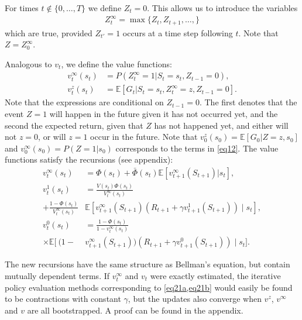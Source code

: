 \documentclass[letterpaper]{article} %
\newcommand{\EE}{\mathbb{E}}
\begin{document}
	For times $t \notin \{0,\dots,T\}$ we define $Z_t = 0$. This allows us to introduce the variables %
	\begin{align}
		Z_t^\infty = \max\{Z_t,Z_{t+1}, \dots,\} %
	\end{align} 
	which are true, provided $Z_{t'}=1$ occurs at a time step following $t$. Note that $Z = Z_0^\infty$. 
	
	
	Analogous to $v_t$, we define the value functions:
	\begin{align}
		v^{\infty}_t(s_t) & = P(Z^\infty_t =1 | S_t=s_t, Z_{t-1} = 0), \label{eq18} \\
		v^{z}_t(s_t) & = \EE[G_t | S_t=s_t, Z_t^\infty = z, Z_{t-1} = 0].  \label{eq19} 
	\end{align}
	Note that the expressions are conditional on $Z_{t-1} = 0$. The first denotes that the event $Z=1$ will happen in the future given it has not occurred yet, and the second the expected return, given that $Z$ has not happened yet, and either will not $z=0$, or will $z=1$ occur in the future. Note that $v^z_{0}(s_0) = \EE\left[G_0 | Z=z,s_0\right]$ and $v^\infty_0(s_0) = P(Z=1|s_0)$ corresponds to the terms in \cref{eq12}. The value functions satisfy the recursions (see appendix): %
	\begin{subequations} \label{eqx19}
		\begin{align}%
			v^\infty_t(s_t) & = \Phi(s_t) + \bar \Phi(s_t) \EE\left[ v^\infty_{t+1}(S_{t+1} )| s_t\right],\label{eq20a}   \\ 
			v^{1}_t(s_t) & =  \frac{ V(s_t) \Phi(s_t) }{V_t^\infty(s_t) }   \label{eq21a}  \\
			+ \frac{  1\!-\! \Phi(s_t)  }{V_t^\infty(s_t) } & \EE\left[ v^\infty_{t+1}(S_{t+1}) \left( R_{t+1} + \gamma v^{1}_{t+1}(S_{t+1} ) \right) \mid s_t   \right], \nonumber \\
			v^{0}_t(s_t) & = 
			\frac{ 1- \Phi(s_t)  }{ 1\!-\!v_t^\infty(s_t) } \label{eq21b} \\
			\times \EE[
			\ ( 1-&v_{t+1}^\infty(S_{t+1}) )( 
			R_{t+1}  + \gamma v^{0}_{t+1}(S_{t+1}) ) \mid s_t ].  \nonumber
		\end{align}
	\end{subequations}
	
	The new recursions have the same structure as Bellman's equation, but contain mutually dependent terms. If $v_t^\infty$ and $v_t$ were exactly estimated, the iterative policy evaluation methods corresponding to \cref{eq21a,eq21b} would easily be found to be contractions with constant $\gamma$, but the updates also converge when $v^z$, $v^\infty$ and $v$ are all bootstrapped. A proof can be found in the appendix. %
	
\end{document}
